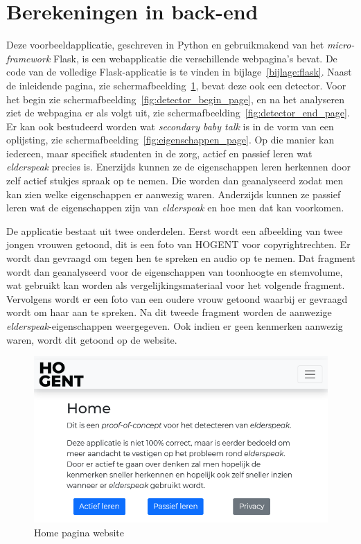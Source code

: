 \section{Berekeningen in back-end}
Deze voorbeeldapplicatie, geschreven in Python en gebruikmakend van het \textit{micro-framework} Flask, is een webapplicatie die verschillende webpagina's bevat. De code van de volledige Flask-applicatie is te vinden in bijlage~\ref{bijlage:flask}. Naast de inleidende pagina, zie schermafbeelding~\ref{fig:home_page}, bevat deze ook een detector. Voor het begin zie schermafbeelding~\ref{fig:detector_begin_page}, en na het analyseren ziet de webpagina er als volgt uit, zie schermafbeelding~\ref{fig:detector_end_page}. Er kan ook bestudeerd worden wat \textit{secondary baby talk} is in de vorm van een oplijsting, zie schermafbeelding~\ref{fig:eigenschappen_page}. Op die manier kan iedereen, maar specifiek studenten in de zorg, actief en passief leren wat \textit{elderspeak} precies is. Enerzijds kunnen ze de eigenschappen leren herkennen door zelf actief stukjes spraak op te nemen. Die worden dan geanalyseerd zodat men kan zien welke eigenschappen er aanwezig waren. Anderzijds kunnen ze passief leren wat de eigenschappen zijn van \textit{elderspeak} en hoe men dat kan voorkomen.

De applicatie bestaat uit twee onderdelen. Eerst wordt een afbeelding van twee jongen vrouwen getoond, dit is een foto van HOGENT voor copyrightrechten. Er wordt dan gevraagd om tegen hen te spreken en audio op te nemen. Dat fragment wordt dan geanalyseerd voor de eigenschappen van toonhoogte en stemvolume, wat gebruikt kan worden als vergelijkingsmateriaal voor het volgende fragment.
Vervolgens wordt er een foto van een oudere vrouw getoond waarbij er gevraagd wordt om haar aan te spreken. Na dit tweede fragment worden de aanwezige \textit{elderspeak}-eigenschappen weergegeven. Ook indien er geen kenmerken aanwezig waren, wordt dit getoond op de website.


\begin{figure}
    \centering
    \includegraphics[width=1\textwidth]{./img/home_website}
    \caption{\label{fig:home_page} Home pagina website}
\end{figure}



